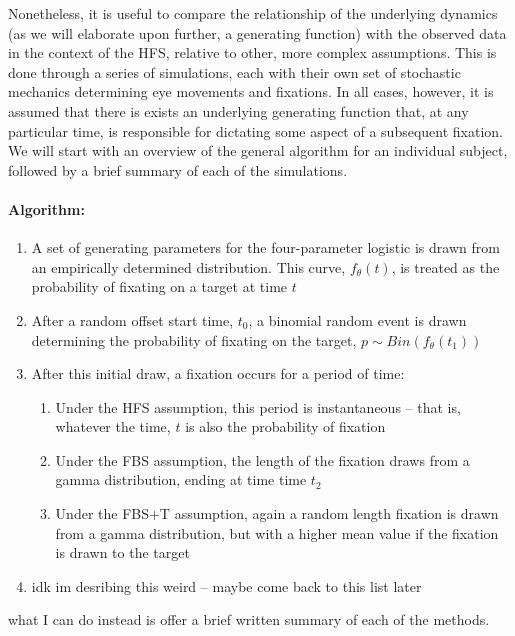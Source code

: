 \documentclass{article}
\begin{document}
Nonetheless, it is useful to compare the relationship of the underlying dynamics (as we will elaborate upon further, a generating function) with the observed data in the context of the HFS, relative to other, more complex assumptions. This is done through a series of simulations, each with their own set of stochastic mechanics determining eye movements and fixations. In all cases, however, it is assumed that there is exists an underlying generating function that, at any particular time, is responsible for dictating some aspect of a subsequent fixation. We will start with an overview of the general algorithm for an individual subject, followed by a brief summary of each of the simulations.

\paragraph{Algorithm:}
\begin{singlespace}
\begin{enumerate}
\item A set of generating parameters for the four-parameter logistic is drawn from an empirically determined distribution. This curve, $f_{\theta}(t)$, is treated as the probability of fixating on a target at time $t$
\item After a random offset start time, $t_0$, a binomial random event is drawn determining the probability of fixating on the target, $p \sim Bin(f_{\theta}(t_1))$
\item After this initial draw, a fixation occurs for a period of time:
\begin{enumerate}
\item Under the HFS assumption, this period is instantaneous -- that is, whatever the time, $t$ is also the probability of fixation
\item Under the FBS assumption, the length of the fixation draws from a gamma distribution, ending at time time $t_2$
\item Under the FBS+T assumption, again a random length fixation is drawn from a gamma distribution, but with a higher mean value if the fixation is drawn to the target
\end{enumerate}
\item idk im desribing this weird -- maybe come back to this list later
\end{enumerate}
\end{singlespace}

what I can do instead is offer a brief written summary of each of the methods.
\end{document}
